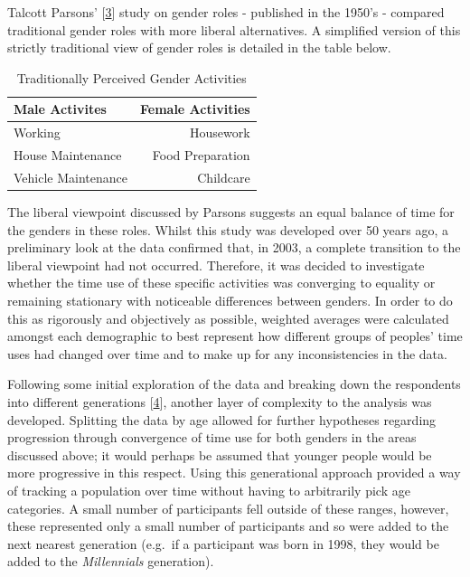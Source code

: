 \documentclass[11pt,]{article}
\begin{document}
Talcott Parsons' {[}\protect\hyperlink{ref-10.2307ux2f2085686}{3}{]}
study on gender roles - published in the 1950's - compared traditional
gender roles with more liberal alternatives. A simplified version of
this strictly traditional view of gender roles is detailed in the table
below.

\begin{table}[H]

\caption{\label{tab:unnamed-chunk-2}Traditionally Perceived Gender Activities}
\centering
\begin{tabular}[t]{lr}
\toprule
Male Activites & Female Activities\\
\midrule
Working & Housework\\
House Maintenance & Food Preparation\\
Vehicle Maintenance & Childcare\\
\bottomrule
\end{tabular}
\end{table}

The liberal viewpoint discussed by Parsons suggests an equal balance of
time for the genders in these roles. Whilst this study was developed
over 50 years ago, a preliminary look at the data confirmed that, in
2003, a complete transition to the liberal viewpoint had not occurred.
Therefore, it was decided to investigate whether the time use of these
specific activities was converging to equality or remaining stationary
with noticeable differences between genders. In order to do this as
rigorously and objectively as possible, weighted averages were
calculated amongst each demographic to best represent how different
groups of peoples' time uses had changed over time and to make up for
any inconsistencies in the data.

Following some initial exploration of the data and breaking down the
respondents into different generations
{[}\protect\hyperlink{ref-generations}{4}{]}, another layer of
complexity to the analysis was developed. Splitting the data by age
allowed for further hypotheses regarding progression through convergence
of time use for both genders in the areas discussed above; it would
perhaps be assumed that younger people would be more progressive in this
respect. Using this generational approach provided a way of tracking a
population over time without having to arbitrarily pick age categories.
A small number of participants fell outside of these ranges, however,
these represented only a small number of participants and so were added
to the next nearest generation (e.g.~if a participant was born in 1998,
they would be added to the \emph{Millennials} generation).
\end{document}
